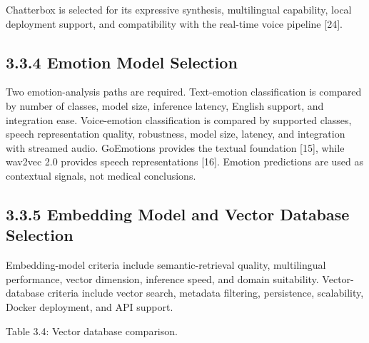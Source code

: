 \documentclass[
  letterpaper,
  12pt,
  a4paper,
  openany]{report}
\begin{document}
Chatterbox is selected for its expressive synthesis, multilingual
capability, local deployment support, and compatibility with the
real-time voice pipeline {[}24{]}.

\subsection{3.3.4 Emotion Model
Selection}\label{emotion-model-selection}

Two emotion-analysis paths are required. Text-emotion classification is
compared by number of classes, model size, inference latency, English
support, and integration ease. Voice-emotion classification is compared
by supported classes, speech representation quality, robustness, model
size, latency, and integration with streamed audio. GoEmotions provides
the textual foundation {[}15{]}, while wav2vec 2.0 provides speech
representations {[}16{]}. Emotion predictions are used as contextual
signals, not medical conclusions.

\subsection{3.3.5 Embedding Model and Vector Database
Selection}\label{embedding-model-and-vector-database-selection}

Embedding-model criteria include semantic-retrieval quality,
multilingual performance, vector dimension, inference speed, and domain
suitability. Vector-database criteria include vector search, metadata
filtering, persistence, scalability, Docker deployment, and API support.

Table 3.4: Vector database comparison.
\end{document}
